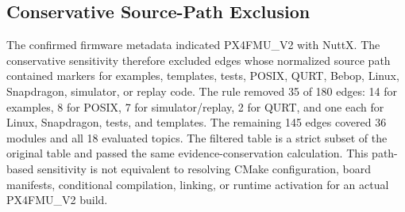 \subsection{Conservative Source-Path Exclusion}

The confirmed firmware metadata indicated PX4FMU\_V2 with NuttX. The conservative sensitivity therefore excluded edges whose normalized source path contained markers for examples, templates, tests, POSIX, QURT, Bebop, Linux, Snapdragon, simulator, or replay code. The rule removed 35 of 180 edges: 14 for examples, 8 for POSIX, 7 for simulator/replay, 2 for QURT, and one each for Linux, Snapdragon, tests, and templates. The remaining 145 edges covered 36 modules and all 18 evaluated topics. The filtered table is a strict subset of the original table and passed the same evidence-conservation calculation. This path-based sensitivity is not equivalent to resolving CMake configuration, board manifests, conditional compilation, linking, or runtime activation for an actual PX4FMU\_V2 build.

